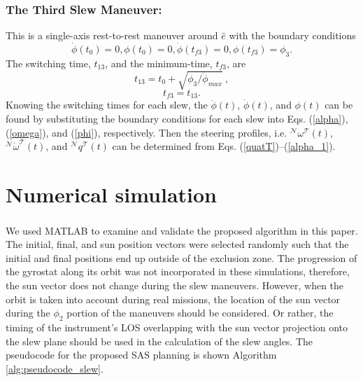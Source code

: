 \documentclass[journal ]{new-aiaa}
\begin{document}
	
	
	\subsubsection{The Third Slew Maneuver:}
	 This is a  single-axis rest-to-rest maneuver around $\hat{e}$ with the boundary conditions
	\begin{equation}\label{Bc3}
	\dot{\phi}(t_0)=0,\phi(t_0)=0, \dot{\phi}(t_{f3})=0,\phi(t_{f3})=\phi_3.
	\end{equation}
	The switching time, $t_{13}$, and the minimum-time, $t_{f3}$, are
	\begin{equation}\label{t31}
	t_{13}=t_0+\sqrt{\phi_3/\ddot{\phi}_{max}}\ ,
	\end{equation}
	\begin{equation}\label{tf3}
	t_{f3}=t_{13}.
	\end{equation}
	Knowing the switching times for each slew, the $\ddot{\phi}(t)$, $\dot{\phi}(t)$, and  $\phi(t)$ can be found by substituting the boundary conditions for each slew into Eqs. (\ref{alpha}), (\ref{omega}), and (\ref{phi}), respectively. Then the steering profiles, i.e. $^\mathcal{N}\omega^\mathcal{T}(t)$, $^\mathcal{N}\dot{\omega}^\mathcal{T}(t)$, and $^\mathcal{N}q^\mathcal{T}(t)$ can be determined from Eqs. (\ref{quatT})--(\ref{alpha_1}).	
\section{Numerical simulation} 
We used MATLAB\textsuperscript{\textregistered} to examine and validate the proposed algorithm in this paper. The initial, final, and sun position vectors were selected randomly such that the initial and final positions end up outside of the exclusion zone. The progression of the gyrostat along its orbit was not incorporated in these simulations, therefore, the sun vector does not change during the slew maneuvers. However, when the orbit is taken into account during real missions, the location of the sun vector during the $\phi_2$ portion of the maneuvers should be considered. Or rather, the timing of the instrument's LOS overlapping with the sun vector projection onto the slew plane should be used in the calculation of the slew angles. 
The pseudocode for the proposed SAS planning is shown Algorithm \ref{alg:pseudocode_slew}.   
 
\end{document}
